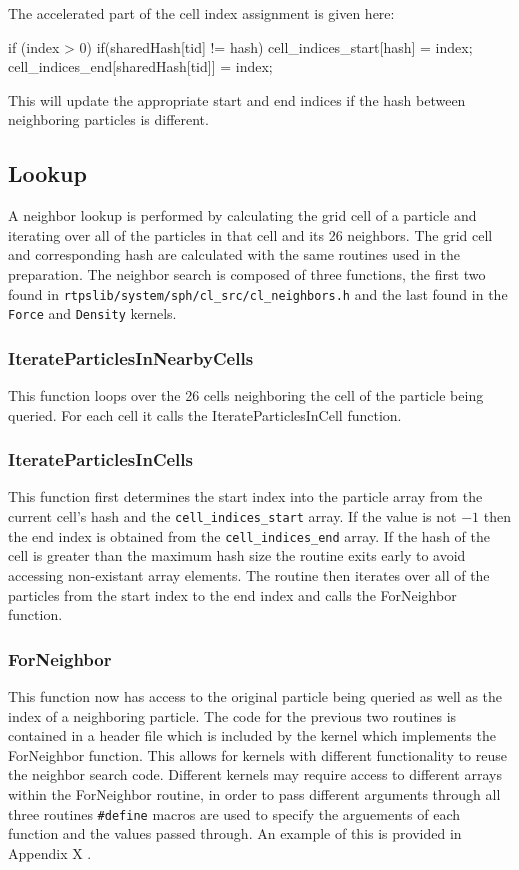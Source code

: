 The accelerated part of the cell index assignment is given here:
\begin{cppcode}{0}
if (index > 0)
{
    if(sharedHash[tid] != hash)
    {
        cell_indices_start[hash] = index;
        cell_indices_end[sharedHash[tid]] = index;
    }
}
\end{cppcode}

This will update the appropriate start and end indices if the hash between
neighboring particles is different.

\subsection{Lookup}
A neighbor lookup is performed by calculating the grid cell of a particle and
iterating over all of the particles in that cell and its 26 neighbors. The grid
cell and corresponding hash are calculated with the same routines used in the
preparation. The neighbor search is composed of three functions, the first two
found in \verb|rtpslib/system/sph/cl_src/cl_neighbors.h| and the last found in
the \verb|Force| and \verb|Density| kernels.

\subsubsection{IterateParticlesInNearbyCells}
This function loops over the 26 cells neighboring the cell of the particle
being queried. For each cell it calls the IterateParticlesInCell function.

\subsubsection{IterateParticlesInCells}
This function first determines the start index into the particle array from the
current cell's hash and the \verb|cell_indices_start| array. If the value is
not $-1$ then the end index is obtained from the \verb|cell_indices_end| array.
If the hash of the cell is greater than the maximum hash size the routine exits
early to avoid accessing non-existant array elements. The routine then iterates
over all of the particles from the start index to the end index and calls the
ForNeighbor function.

\subsubsection{ForNeighbor}
This function now has access to the original particle being queried as well as
the index of a neighboring particle. The code for the previous two routines is
contained in a header file which is included by the kernel which implements the
ForNeighbor function. This allows for kernels with different functionality to
reuse the neighbor search code. Different kernels may require access to
different arrays within the ForNeighbor routine, in order to pass different
arguments through all three routines \verb|#define| macros are used to specify
the arguements of each function and the values passed through. An example of
this is provided in Appendix X .

